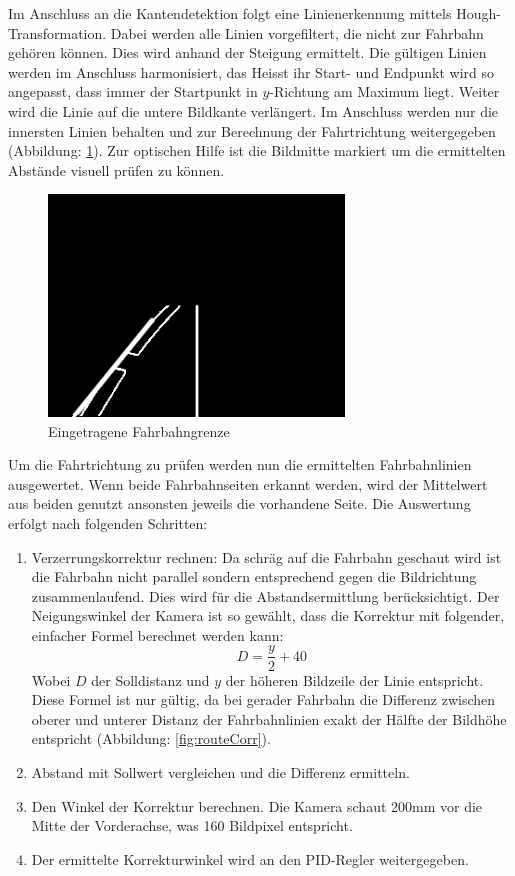 Im Anschluss an die Kantendetektion folgt eine Linienerkennung mittels Hough-Transformation. Dabei werden alle Linien vorgefiltert, die nicht zur Fahrbahn gehören können. Dies wird anhand der Steigung ermittelt. Die gültigen Linien werden im Anschluss harmonisiert, das Heisst ihr Start- und Endpunkt wird so angepasst, dass 
immer der Startpunkt in $y$-Richtung am Maximum liegt. Weiter wird die Linie auf die untere Bildkante verlängert. Im Anschluss werden nur die innersten Linien behalten und zur Berechnung der Fahrtrichtung weitergegeben (Abbildung: \ref{fig:routeLimits}). Zur optischen Hilfe ist die Bildmitte markiert um die ermittelten Abstände visuell prüfen zu können.
\begin{figure}[H]%
\centering
\includegraphics[width=0.7\textwidth]{03_Loesungskonzept/pictures/Fahrbahnlinien.png}
\caption{Eingetragene Fahrbahngrenze}
\label{fig:routeLimits}
\end{figure}
Um die Fahrtrichtung zu prüfen werden nun die ermittelten Fahrbahnlinien ausgewertet. Wenn beide Fahrbahnseiten erkannt werden, wird der Mittelwert aus beiden genutzt ansonsten jeweils die vorhandene Seite. Die Auswertung erfolgt nach folgenden Schritten:
\begin{enumerate}
\item Verzerrungskorrektur rechnen: Da schräg auf die Fahrbahn geschaut wird ist die Fahrbahn nicht parallel sondern entsprechend gegen die Bildrichtung zusammenlaufend. Dies wird für die Abstandsermittlung berücksichtigt. Der Neigungswinkel der Kamera ist so gewählt, dass die Korrektur mit folgender, einfacher Formel berechnet werden kann:
\[
D = \frac{y}{2} + 40 
\]
Wobei $D$ der Solldistanz und $y$ der höheren Bildzeile der Linie entspricht. Diese Formel ist nur gültig, da bei gerader Fahrbahn die Differenz zwischen oberer und unterer Distanz der Fahrbahnlinien exakt der Hälfte der Bildhöhe entspricht (Abbildung: \ref{fig:routeCorr}).
\item Abstand mit Sollwert vergleichen und die Differenz ermitteln.
\item Den Winkel der Korrektur berechnen. Die Kamera schaut 200mm vor die Mitte der Vorderachse, was 160 Bildpixel entspricht.
\item Der ermittelte Korrekturwinkel wird an den PID-Regler weitergegeben.
\end{enumerate}
